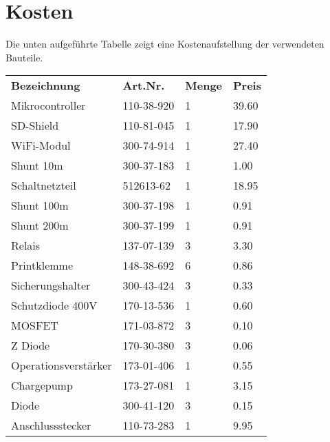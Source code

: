 \section{Kosten} \label{sec:kosten}
Die unten aufgeführte Tabelle zeigt eine Kostenaufstellung der verwendeten Bauteile.
\begin{table}[h]
\centering
\begin{tabular}{llll}
\textbf{Bezeichnung}   & \textbf{Art.Nr.} & \textbf{Menge} & \textbf{Preis}  \\
Mikrocontroller        & 110-38-920       & 1              & 39.60           \\
SD-Shield              & 110-81-045       & 1              & 17.90           \\
WiFi-Modul             & 300-74-914       & 1              & 27.40           \\
Shunt 10m              & 300-37-183       & 1              & 1.00            \\
Schaltnetzteil         & 512613-62        & 1              & 18.95           \\
Shunt 100m             & 300-37-198       & 1              & 0.91            \\
Shunt 200m             & 300-37-199       & 1              & 0.91            \\
Relais                 & 137-07-139       & 3              & 3.30            \\
Printklemme            & 148-38-692       & 6              & 0.86            \\
Sicherungshalter       & 300-43-424       & 3              & 0.33            \\
Schutzdiode 400V       & 170-13-536       & 1              & 0.60            \\
MOSFET                 & 171-03-872       & 3              & 0.10            \\
Z Diode                & 170-30-380       & 3              & 0.06            \\
Operationsverstärker   & 173-01-406       & 1              & 0.55            \\
Chargepump             & 173-27-081       & 1              & 3.15            \\
Diode                  & 300-41-120       & 3              & 0.15            \\
Anschlussstecker       & 110-73-283       & 1              & 9.95            \\

\end{tabular}
\end{table}
